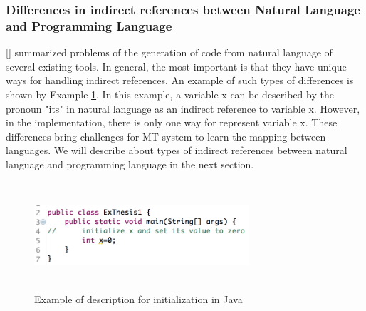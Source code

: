 \subsubsection{Differences in indirect references between Natural Language and Programming Language}
[\cite{Pulido-Prieto:2017:SNP:3145473.3109481}] summarized problems of the generation of code from natural language of several existing tools. In general, the most important is that they have unique ways for handling indirect references. An example of such types of differences is shown by Example \ref{fig:XVarExample}. In this example, a variable x can be described by the pronoun "its" in natural language as an indirect reference to variable x. However, in the implementation, there is only one way for represent variable x. These differences bring challenges for MT system to learn the mapping between languages. We will describe about types of indirect references between natural language and programming language in the next section.
\begin{figure}[htp]
	\centering
	\includegraphics[width=8cm,height=4cm]{resources/fig_xvar_example.png}
	\caption[Example of description for initialization in Java ] {Example of description for initialization in Java}
	\label{fig:XVarExample}
\end{figure}
